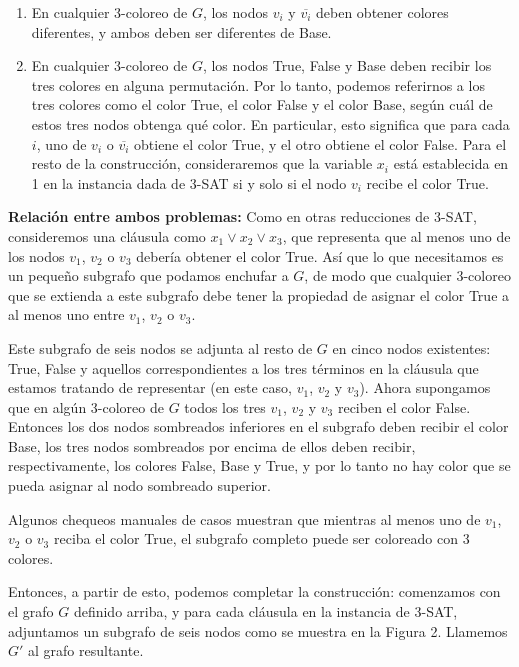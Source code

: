 \documentclass[9pt]{article}
\begin{document}
\begin{enumerate}
    \item En cualquier 3-coloreo de \( G \), los nodos \( v_i \) y \( \overline{v_i} \) deben obtener colores diferentes, y ambos deben ser diferentes de Base.
    \item En cualquier 3-coloreo de \( G \), los nodos True, False y Base deben recibir los tres colores en alguna permutación. Por lo tanto, podemos referirnos a los tres colores como el color True, el color False y el color Base, según cuál de estos tres nodos obtenga qué color. En particular, esto significa que para cada \( i \), uno de \( v_i \) o \( \overline{v_i} \) obtiene el color True, y el otro obtiene el color False. Para el resto de la construcción, consideraremos que la variable \( x_i \) está establecida en 1 en la instancia dada de 3-SAT si y solo si el nodo \( v_i \) recibe el color True.
\end{enumerate}

\textbf{Relación entre ambos problemas:} Como en otras reducciones de 3-SAT, consideremos una cláusula como \( x_1 \lor x_2 \lor x_3 \), que representa que al menos uno de los nodos \( v_1 \), \( v_2 \) o \( v_3 \) debería obtener el color True. Así que lo que necesitamos es un pequeño subgrafo que podamos enchufar a \( G \), de modo que cualquier 3-coloreo que se extienda a este subgrafo debe tener la propiedad de asignar el color True a al menos uno entre \( v_1 \), \( v_2 \) o \( v_3 \).

Este subgrafo de seis nodos se adjunta al resto de \( G \) en cinco nodos existentes: True, False y aquellos correspondientes a los tres términos en la cláusula que estamos tratando de representar (en este caso, \( v_1 \), \( v_2 \) y \( v_3 \)). Ahora supongamos que en algún 3-coloreo de \( G \) todos los tres \( v_1 \), \( v_2 \) y \( v_3 \) reciben el color False. Entonces los dos nodos sombreados inferiores en el subgrafo deben recibir el color Base, los tres nodos sombreados por encima de ellos deben recibir, respectivamente, los colores False, Base y True, y por lo tanto no hay color que se pueda asignar al nodo sombreado superior.

Algunos chequeos manuales de casos muestran que mientras al menos uno de \( v_1 \), \( v_2 \) o \( v_3 \) reciba el color True, el subgrafo completo puede ser coloreado con 3 colores.

        Entonces, a partir de esto, podemos completar la construcción: comenzamos con el grafo \( G \) definido arriba, y para cada cláusula en la instancia de 3-SAT, adjuntamos un subgrafo de seis nodos como se muestra en la Figura 2. Llamemos \( G' \) al grafo resultante.
\end{document}
